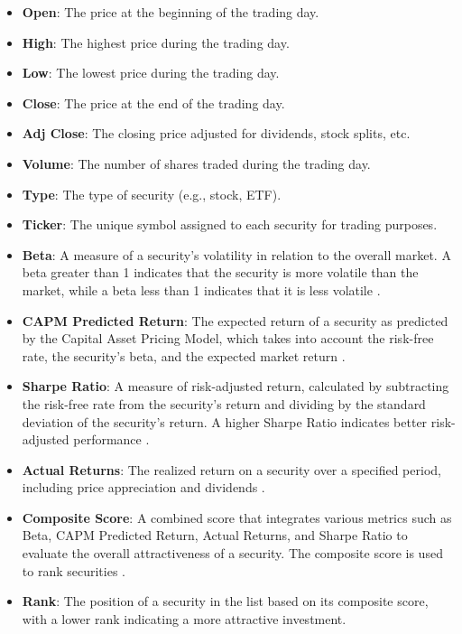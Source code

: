 \begin{itemize}
    \item \textbf{Open}: The price at the beginning of the trading day.
    \item \textbf{High}: The highest price during the trading day.
    \item \textbf{Low}: The lowest price during the trading day.
    \item \textbf{Close}: The price at the end of the trading day.
    \item \textbf{Adj Close}: The closing price adjusted for dividends, stock splits, etc.
    \item \textbf{Volume}: The number of shares traded during the trading day.
    \item \textbf{Type}: The type of security (e.g., stock, ETF).
    \item \textbf{Ticker}: The unique symbol assigned to each security for trading purposes.
    \item \textbf{Beta}: A measure of a security's volatility in relation to the overall market. A beta greater than 1 indicates that the security is more volatile than the market, while a beta less than 1 indicates that it is less volatile \citep{sharpe1966mutual}.
    \item \textbf{CAPM Predicted Return}: The expected return of a security as predicted by the Capital Asset Pricing Model, which takes into account the risk-free rate, the security's beta, and the expected market return \citep{markowitz1952portfolio}.
    \item \textbf{Sharpe Ratio}: A measure of risk-adjusted return, calculated by subtracting the risk-free rate from the security's return and dividing by the standard deviation of the security's return. A higher Sharpe Ratio indicates better risk-adjusted performance \citep{sharpe1966mutual}.
    \item \textbf{Actual Returns}: The realized return on a security over a specified period, including price appreciation and dividends \citep{fama1970efficient}.
    \item \textbf{Composite Score}: A combined score that integrates various metrics such as Beta, CAPM Predicted Return, Actual Returns, and Sharpe Ratio to evaluate the overall attractiveness of a security. The composite score is used to rank securities \citep{smith2020}.
    \item \textbf{Rank}: The position of a security in the list based on its composite score, with a lower rank indicating a more attractive investment.
\end{itemize}

\newpage
